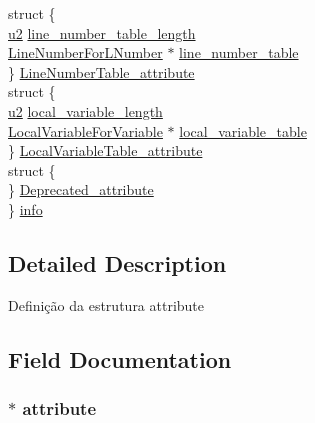 \begin{DoxyCompactItemize}
\begin{tabbing}
\>struct \{\\
\>\>\hyperlink{macros_8h_a732cde1300aafb73b0ea6c2558a7a54f}{u2} \hyperlink{structattribute__info__e_ac5528d280b9c73aee17902c9e7e70825}{line\_number\_table\_length}\\
\>\>\hyperlink{struct_line_number_for_l_number}{LineNumberForLNumber} $\ast$ \hyperlink{structattribute__info__e_a18cef95bbf08bcf802cd99cbd45d8826}{line\_number\_table}\\
\>\} \hyperlink{structattribute__info__e_a14003560cab12584bbbc83ec4a998b51}{LineNumberTable\_attribute}\\
\>struct \{\\
\>\>\hyperlink{macros_8h_a732cde1300aafb73b0ea6c2558a7a54f}{u2} \hyperlink{structattribute__info__e_a3fa7dd7fd2b0f385ecd16252aa64246e}{local\_variable\_length}\\
\>\>\hyperlink{struct_local_variable_for_variable}{LocalVariableForVariable} $\ast$ \hyperlink{structattribute__info__e_ac992b049f312b1385b995db21e8879ee}{local\_variable\_table}\\
\>\} \hyperlink{structattribute__info__e_ab860114886cdf67265e6c351b969e0b1}{LocalVariableTable\_attribute}\\
\>struct \{\\
\>\} \hyperlink{structattribute__info__e_a8878c862cd9bfb0904ba1bd59e9a7909}{Deprecated\_attribute}\\
\} \hyperlink{structattribute__info__e_a3f81b6538b6aeb16371eb5dc3db3c3e5}{info}\\

\end{tabbing}\end{DoxyCompactItemize}


\subsection{Detailed Description}
Definição da estrutura attribute 

\subsection{Field Documentation}
\hypertarget{structattribute__info__e_a6f532dd7d830de037d40199f21a548b7}{}
\subsubsection[{attribute}]{$\ast$ attribute}\label{structattribute__info__e_a6f532dd7d830de037d40199f21a548b7}
\hypertarget{structattribute__info__e_acd241327151db902e69d1ce0301b47f0}{}
